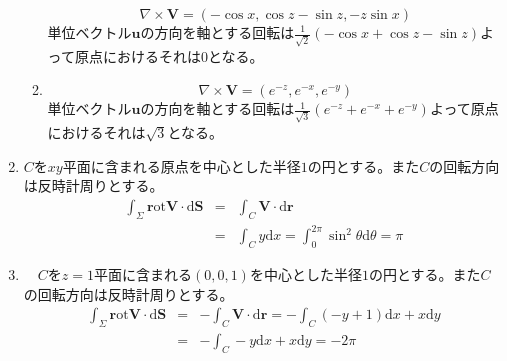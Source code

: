 \documentclass{jarticle}
\def\d{\mathrm d}
\def\rot{\mathrm{\bm rot}}
\begin{document}
\begin{enumerate}
\begin{enumerate}
          \[\nabla \times {\bm V} = (-\cos x, \cos z - \sin z, -z\sin x)\]
          単位ベクトル$\bm u$の方向を軸とする回転は$\frac{1}{\sqrt 2}( -\cos x+\cos z -\sin z)$よって原点におけるそれは$0$となる。
        \item
          \[\nabla \times {\bm V} = (e^{-z},e^{-x},e^{-y})\]
          単位ベクトル$\bm u$の方向を軸とする回転は$\frac{1}{\sqrt 3}(e^{-z}+e^{-x}+e^{-y})$よって原点におけるそれは$\sqrt{3}$となる。
      \end{enumerate}
    \item
      $C$を$xy$平面に含まれる原点を中心とした半径$1$の円とする。また$C$の回転方向は反時計周りとする。
      \begin{eqnarray*}
        \int_\Sigma \rot {\bm V} \cdot \d {\bm S} & = & \int_C {\bm V} \cdot \d {\bm r} \\
        & = & \int_C y \d x = \int_0^{2\pi} \sin^2 \theta \d \theta = \pi
      \end{eqnarray*}
    \item
    　$C$を$z=1$平面に含まれる$(0,0,1)$を中心とした半径$1$の円とする。また$C$の回転方向は反時計周りとする。
      \begin{eqnarray*}
        \int_\Sigma \rot {\bm V} \cdot \d {\bm S} & = & - \int_C {\bm V} \cdot \d {\bm r} = - \int_C (-y+1) \d x + x \d y \\
        & = & - \int_C -y \d x + x \d y = - 2 \pi
      \end{eqnarray*}
  \end{enumerate}
\end{document}
